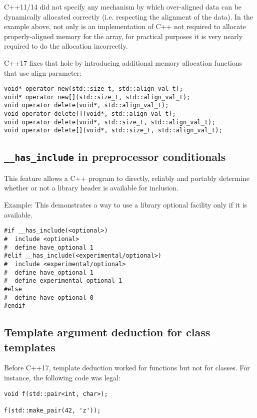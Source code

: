 C++11/14 did not specify any mechanism by which over-aligned data can be dynamically allocated correctly (i.e. respecting the alignment of the data). In the example above, not only is an implementation of C++ not required to allocate properly-aligned memory for the array, for practical purposes it is very nearly required to do the allocation incorrectly.

C++17 fixes that hole by introducing additional memory allocation functions that use align parameter:

\begin{verbatim}
void* operator new(std::size_t, std::align_val_t);
void* operator new[](std::size_t, std::align_val_t);
void operator delete(void*, std::align_val_t);
void operator delete[](void*, std::align_val_t);
void operator delete(void*, std::size_t, std::align_val_t);
void operator delete[](void*, std::size_t, std::align_val_t);
\end{verbatim}

\subsection{\texttt{__has_include} in preprocessor conditionals}

This feature allows a C++ program to directly, reliably and portably determine whether or not a library header is available for inclusion.

Example: This demonstrates a way to use a library optional facility only if it is available.

\begin{verbatim}
#if __has_include(<optional>)
#  include <optional>
#  define have_optional 1
#elif __has_include(<experimental/optional>)
#  include <experimental/optional>
#  define have_optional 1
#  define experimental_optional 1
#else
#  define have_optional 0
#endif
\end{verbatim}

\subsection{Template argument deduction for class templates}

Before C++17, template deduction worked for functions but not for classes. 
For instance, the following code was legal:
\begin{verbatim}
void f(std::pair<int, char>);

f(std::make_pair(42, 'z'));
\end{verbatim}

